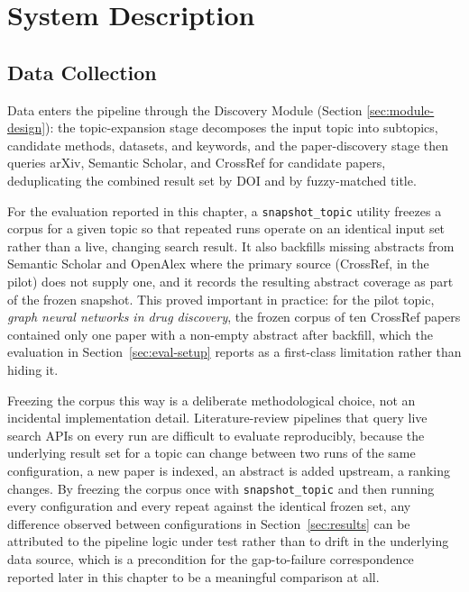 \documentclass[12pt,a4paper]{report}
\begin{document}
\chapter{System Description}
\label{ch:description}

\section{Data Collection}
Data enters the pipeline through the Discovery Module (Section
\ref{sec:module-design}): the topic-expansion stage decomposes the input topic
into subtopics, candidate methods, datasets, and keywords, and the
paper-discovery stage then queries arXiv, Semantic Scholar, and CrossRef for
candidate papers, deduplicating the combined result set by DOI and by
fuzzy-matched title.

For the evaluation reported in this chapter, a \texttt{snapshot\_topic}
utility freezes a corpus for a given topic so that repeated runs operate on an
identical input set rather than a live, changing search result. It also
backfills missing abstracts from Semantic Scholar and OpenAlex where the
primary source (CrossRef, in the pilot) does not supply one, and it records
the resulting abstract coverage as part of the frozen snapshot. This proved
important in practice: for the pilot topic, \emph{graph neural networks in drug
discovery}, the frozen corpus of ten CrossRef papers contained only one paper
with a non-empty abstract after backfill, which the evaluation in
Section~\ref{sec:eval-setup} reports as a first-class limitation rather than
hiding it.

Freezing the corpus this way is a deliberate methodological choice, not an
incidental implementation detail. Literature-review pipelines that query live
search APIs on every run are difficult to evaluate reproducibly, because the
underlying result set for a topic can change between two runs of the same
configuration, a new paper is indexed, an abstract is added upstream, a
ranking changes. By freezing the corpus once with \texttt{snapshot\_topic} and
then running every configuration and every repeat against the identical
frozen set, any difference observed between configurations in
Section~\ref{sec:results} can be attributed to the pipeline logic under test
rather than to drift in the underlying data source, which is a precondition
for the gap-to-failure correspondence reported later in this chapter to be a
meaningful comparison at all.
\end{document}
